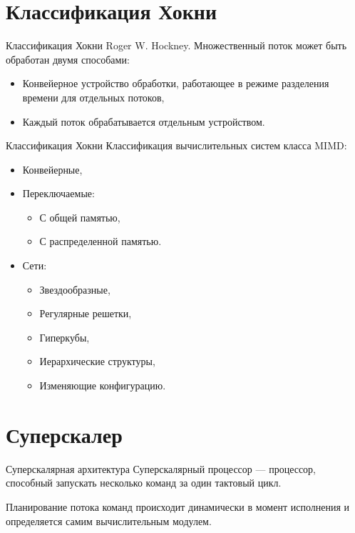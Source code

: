 \section{Классификация Хокни}

\begin{frame}{Классификация Хокни}
Roger W. Hockney.
\vfill
Множественный поток может быть обработан двумя способами:
\begin{itemize}
    \item Конвейерное устройство обработки, работающее в режиме разделения
    времени для отдельных потоков,
    \item Каждый поток обрабатывается отдельным устройством.
\end{itemize}
\end{frame}

\begin{frame}{Классификация Хокни}
Классификация вычислительных систем класса MIMD:
\vfill
\begin{itemize}
    \item Конвейерные,
    \item Переключаемые:
    \begin{itemize}
        \item С общей памятью,
        \item С распределенной памятью.
    \end{itemize}
    \item Сети:
    \begin{itemize}
        \item Звездообразные,
        \item Регулярные решетки,
        \item Гиперкубы,
        \item Иерархические структуры,
        \item Изменяющие конфигурацию.
    \end{itemize}
\end{itemize}
\end{frame}

\section{Суперскалер}

\begin{frame}{Суперскалярная архитектура}
Суперскалярный процессор --- процессор, способный запускать несколько команд за
один тактовый цикл.

\vspace*{1cm}\pause
Планирование потока команд происходит динамически в момент исполнения и определяется самим
вычислительным модулем.
\end{frame}

